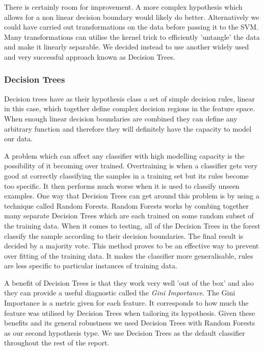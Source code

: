 \documentclass[12pt]{IIBproject}
\begin{document}
There is certainly room for improvement. A more complex hypothesis which allows for a non linear decision boundary would likely do better. Alternatively we could have carried out transformations on the data before passing it to the SVM. Many transformations can utilise the kernel trick\cite{scholkopft1999fisher} to efficiently 'untangle' the data and make it linearly separable. We decided instead to use another widely used and very successful approach known as Decision Trees.
\subsubsection{Decision Trees}

Decision trees have as their hypothesis class a set of simple decision rules, linear in this case, which together define complex decision regions in the feature space\cite{quinlan1986induction}.  When enough linear decision boundaries are combined they can define any arbitrary function and therefore they will definitely have the capacity to model our data. 

A problem which can affect any classifier with high modelling capacity is the possibility of it becoming over trained. Overtraining is when a classifier gets very good at correctly classifying the samples in a training set but its rules become too specific. It then performs much worse when it is used to classify unseen examples. One way that Decision Trees can get around this problem is by using a technique called Random Forests\cite{breiman2001random}. Random Forests works by combing together many separate Decision Trees which are each trained on some random subset of the training data. When it comes to testing, all of the Decision Trees in the forest classify the sample according to their decision boundaries. The final result is decided by a majority vote. This method proves to be an effective way to prevent over fitting of the training data. It makes the classifier more generalisable, rules are less specific to particular instances of training data. 

A benefit of Decision Trees is that they work very well 'out of the box' and also they can provide a useful diagnostic called the \emph{Gini Importance}\cite{menze2009comparison}. The Gini Importance is a metric given for each feature. It corresponds to how much the feature was utilised by Decision Trees when tailoring its hypothesis. Given these benefits and its general robustness we used Decision Trees with Random Forests as our second hypothesis type. We use Decision Trees as the default classifier throughout the rest of the report.
\end{document}
